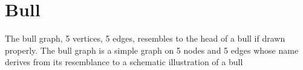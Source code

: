 \newpage\section{Bull}
The bull graph, 5 vertices, 5 edges, resembles to the head of a bull if drawn properly. 
The bull graph is a simple graph on 5 nodes and 5 edges whose name derives from its resemblance to a schematic illustration of a bull 

\begin{center}
\begin{tkzexample}[vbox]
\end{tkzexample} 
\end{center}

\endinput
